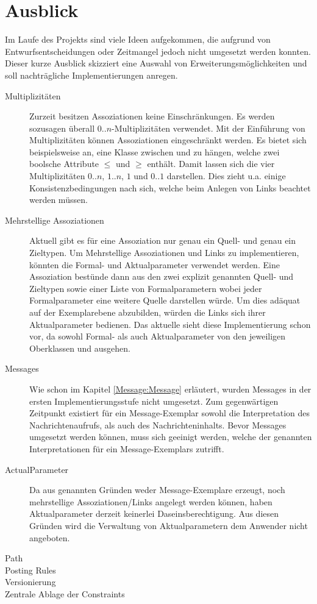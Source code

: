 \section{Ausblick}
Im Laufe des Projekts sind viele Ideen aufgekommen, die aufgrund von Entwurfsentscheidungen oder Zeitmangel 
jedoch nicht umgesetzt werden konnten. Dieser kurze Ausblick skizziert eine Auswahl von Erweiterungsmöglichkeiten und 
soll nachträgliche Implementierungen anregen.

\begin{description}
  \item[Multiplizitäten] Zurzeit besitzen Assoziationen keine Einschränkungen. 
Es werden sozusagen überall $0..n$-Multiplizitäten verwendet. 
Mit der Einführung von Multiplizitäten können Assoziationen eingeschränkt werden.
Es bietet sich beispielsweise an, eine Klasse  zwischen  und  zu hängen,
welche zwei boolsche Attribute $\leq$ und $\geq$ enthält. 
Damit lassen sich die vier Multiplizitäten $0..n$, $1..n$, $1$ und $0..1$ darstellen.
Dies zieht u.a. einige Konsistenzbedingungen nach sich, welche beim Anlegen von Links beachtet werden müssen. 
  \item[Mehrstellige Assoziationen] Aktuell gibt es für eine Assoziation nur genau ein Quell- und genau ein Zieltypen. 
  Um Mehrstellige Assoziationen und Links zu implementieren, könnten die Formal- und Aktualparameter verwendet werden. 
  Eine Assoziation bestünde dann aus den zwei explizit genannten Quell- und Zieltypen sowie einer Liste von Formalparametern 
  wobei jeder Formalparameter eine weitere Quelle darstellen würde. Um dies adäquat auf der Exemplarebene abzubilden, 
  würden die Links sich ihrer Aktualparameter bedienen. Das aktuelle \MM sieht diese Implementierung schon vor, da sowohl 
  Formal- als auch Aktualparameter von den jeweiligen Oberklassen  und  ausgehen.
  \item[Messages] Wie schon im Kapitel \ref{Message:Message} erläutert, wurden Messages in der ersten Implementierungsstufe nicht umgesetzt. 
  Zum gegenwärtigen Zeitpunkt existiert für ein Message-Exemplar sowohl die Interpretation des Nachrichtenaufrufs, als auch des Nachrichteninhalts.
Bevor Messages umgesetzt werden können, muss sich geeinigt werden, welche der genannten Interpretationen für ein Message-Exemplars zutrifft. 
  \item[ActualParameter] Da aus genannten Gründen weder Message-Exemplare erzeugt, noch mehrstellige Assoziationen/Links angelegt werden können, 
  haben Aktualparameter derzeit keinerlei Daseinsberechtigung. Aus diesen Gründen wird die Verwaltung von Aktualparametern dem Anwender nicht angeboten.
  \item[Path] 
  \item[Posting Rules] 
  \item[Versionierung] 
  \item[Zentrale Ablage der Constraints] 
\end{description}
  